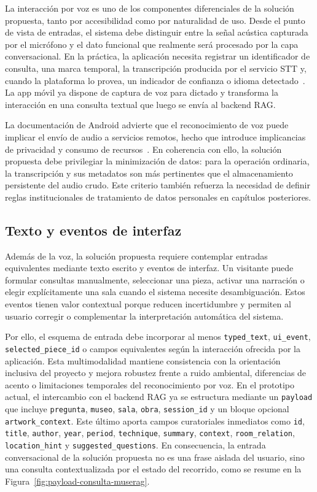 La interacción por voz es uno de los componentes diferenciales de la solución propuesta, tanto por accesibilidad como por naturalidad de uso. Desde el punto de vista de entradas, el sistema debe distinguir entre la señal acústica capturada por el micrófono y el dato funcional que realmente será procesado por la capa conversacional. En la práctica, la aplicación necesita registrar un identificador de consulta, una marca temporal, la transcripción producida por el servicio STT y, cuando la plataforma lo provea, un indicador de confianza o idioma detectado~\cite{android2026speech,wang2024voiceguide}. La app móvil ya dispone de captura de voz para dictado y transforma la interacción en una consulta textual que luego se envía al backend RAG.

La documentación de Android advierte que el reconocimiento de voz puede implicar el envío de audio a servicios remotos, hecho que introduce implicancias de privacidad y consumo de recursos~\cite{android2026speech}. En coherencia con ello, la solución propuesta debe privilegiar la minimización de datos: para la operación ordinaria, la transcripción y sus metadatos son más pertinentes que el almacenamiento persistente del audio crudo. Este criterio también refuerza la necesidad de definir reglas institucionales de tratamiento de datos personales en capítulos posteriores.

\subsection{Texto y eventos de interfaz}

Además de la voz, la solución propuesta requiere contemplar entradas equivalentes mediante texto escrito y eventos de interfaz. Un visitante puede formular consultas manualmente, seleccionar una pieza, activar una narración o elegir explícitamente una sala cuando el sistema necesite desambiguación. Estos eventos tienen valor contextual porque reducen incertidumbre y permiten al usuario corregir o complementar la interpretación automática del sistema.

Por ello, el esquema de entrada debe incorporar al menos \texttt{typed\_text}, \texttt{ui\_event}, \texttt{selected\_piece\_id} o campos equivalentes según la interacción ofrecida por la aplicación. Esta multimodalidad mantiene consistencia con la orientación inclusiva del proyecto y mejora robustez frente a ruido ambiental, diferencias de acento o limitaciones temporales del reconocimiento por voz. En el prototipo actual, el intercambio con el backend RAG ya se estructura mediante un \texttt{payload} que incluye \texttt{pregunta}, \texttt{museo}, \texttt{sala}, \texttt{obra}, \texttt{session\_id} y un bloque opcional \texttt{artwork\_context}. Este último aporta campos curatoriales inmediatos como \texttt{id}, \texttt{title}, \texttt{author}, \texttt{year}, \texttt{period}, \texttt{technique}, \texttt{summary}, \texttt{context}, \texttt{room\_relation}, \texttt{location\_hint} y \texttt{suggested\_questions}. En consecuencia, la entrada conversacional de la solución propuesta no es una frase aislada del usuario, sino una consulta contextualizada por el estado del recorrido, como se resume en la Figura~\ref{fig:payload-consulta-muserag}.

